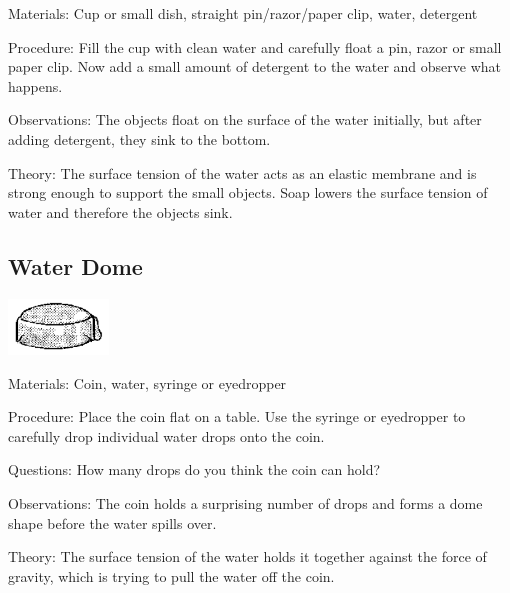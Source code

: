 \begin{multicols}{2}
\begin{description*}
\item[Materials:]{Cup or small dish, straight pin/razor/paper clip, water, detergent}
\item[Procedure:]{Fill the cup with clean water and carefully float a pin, razor or small paper clip. Now add a small amount of detergent to the water and observe what happens.}
\item[Observations:]{The objects float on the surface of the water initially, but after adding detergent, they sink to the bottom.}
\item[Theory:]{The surface tension of the water acts as an elastic membrane and is strong enough to support the small objects. Soap lowers the surface tension of water and therefore the objects sink.}
\end{description*}

\subsection{Water Dome}

\begin{center}
\includegraphics[width=0.2\textwidth]{./img/source/water-dome.png}
\end{center}

\begin{description*}
\item[Materials:]{Coin, water, syringe or eyedropper}
\item[Procedure:]{Place the coin flat on a table. Use the syringe or eyedropper to carefully drop individual water drops onto the coin.}
\item[Questions:]{How many drops do you think the coin can hold?}
\item[Observations:]{The coin holds a surprising number of drops and forms a dome shape before the water spills over.}
\item[Theory:]{The surface tension of the water holds it together against the force of gravity, which is trying to pull the water off the coin.}
\end{description*}


\end{multicols}
